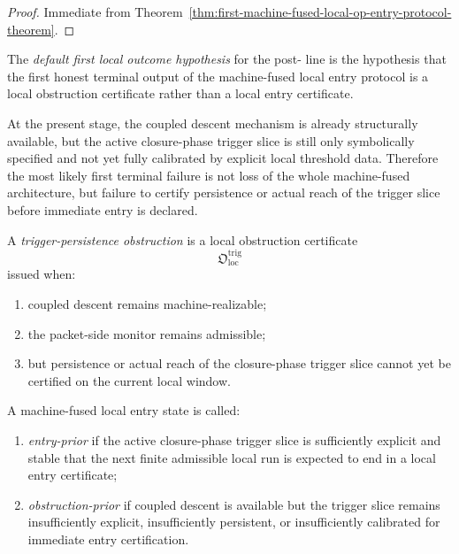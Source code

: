 \begin{proof}
Immediate from Theorem~\ref{thm:first-machine-fused-local-op-entry-protocol-theorem}.
\end{proof}



\begin{definition}
\label{def:default-first-local-outcome-hypothesis}
The \emph{default first local outcome hypothesis} for the post- line is the hypothesis that the first honest terminal output of the machine-fused local entry protocol is a local obstruction certificate rather than a local entry certificate.
\end{definition}

\begin{remark}
\label{rem:why-obstruction-is-the-current-default}
At the present stage, the coupled descent mechanism is already structurally available, but the active closure-phase trigger slice is still only symbolically specified and not yet fully calibrated by explicit local threshold data. Therefore the most likely first terminal failure is not loss of the whole machine-fused architecture, but failure to certify persistence or actual reach of the trigger slice before immediate entry is declared.
\end{remark}

\begin{definition}
\label{def:trigger-persistence-obstruction}
A \emph{trigger-persistence obstruction} is a local obstruction certificate
\[
\mathfrak{O}_{\mathrm{loc}}^{\mathrm{trig}}
\]
issued when:
\begin{enumerate}
 \item coupled descent remains machine-realizable;
 \item the packet-side monitor remains admissible;
 \item but persistence or actual reach of the closure-phase trigger slice cannot yet be certified on the current local window.
\end{enumerate}
\end{definition}

\begin{definition}
\label{def:entry-prior-versus-obstruction-prior-local-regime}
A machine-fused local entry state is called:
\begin{enumerate}
 \item \emph{entry-prior} if the active closure-phase trigger slice is sufficiently explicit and stable that the next finite admissible local run is expected to end in a local entry certificate;
 \item \emph{obstruction-prior} if coupled descent is available but the trigger slice remains insufficiently explicit, insufficiently persistent, or insufficiently calibrated for immediate entry certification.
\end{enumerate}
\end{definition}

